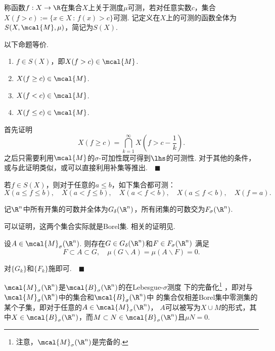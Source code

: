    \begin{defi}[可测]
     称函数$f:X\to\R$在集合$X$上关于测度$\mu$可测，若对任意实数$c$，集合$X(f>c):=\{x\in X
     \,:\,f(x)>c\}$可测. 记定义在$X$上的可测的函数全体为$S(X,\mcal{M}, \mu)$，简记为$S(X)$.
   \end{defi}

  \begin{lemma}
    以下命题等价.
    \begin{enumerate}
      \item $f\in S(X)$，即$X(f>c)\in\mcal{M}$.
      \item $X(f\ge c)\in\mcal{M}$.
      \item $X(f<c)\in\mcal{M}$.
      \item $X(f\le c)\in\mcal{M}$.
    \end{enumerate}
  \end{lemma}
  \proof
    首先证明
    \[
      X(f\ge c) = \bigcap_{k=1}^\infty X\left(f>c-\frac{1}{k}\right).
    \]
    之后只需要利用$\mcal{M}$的$\sigma$-可加性既可得到$\lhs$的可测性. 对于其他的条件，
    或与此证明类似，或可以直接利用补集等推出.$\quad\blacksquare$

  \begin{cor}
    若$f\in S(X)$，则对于任意的$a\le b$，如下集合都可测：
    \[
      X(a\le f\le b),\quad X(a<f\le b),\quad X(a<f<b),\quad X(a\le f<b), \quad 
      X(f=a).
    \]
  \end{cor}




  \begin{defi}
    记$\R^n$中所有开集的可数并全体为$G_\delta(\R^n)$，所有闭集的可数交为$F_\sigma(\R^n)$.
  \end{defi}
  \remark
    可以证明，这两个集合实际就是Borel集. 相关的证明见.

  \begin{thm}
    \label{thm: sigma-可测、开集、闭集}
    设$A\in\mcal{M}_\sigma(\R^n)$. 则存在$G\in G_\delta(\R^n)$和$F\in F_\sigma(\R^n)$
    满足
    \[
      F\subset A\subset G,\quad \mu(G\backslash A) = \mu(A\backslash F) = 0.
    \]
  \end{thm}
  \proof
    对$\{ G_k\}$和$\{ F_k\}$施即可.$\quad\blacksquare$

  \begin{cor}
    $\mcal{M}_\sigma(\R^n)$是$\mcal{B}_\sigma(\R^n)$的在Lebesgue-$\sigma$测度
    下的完备化\footnote{注意，$\mcal{M}_\sigma(\R^n)$是完备的.}
    ，即对与$\mcal{M}_\sigma(\R^n)$中的集合和$\mcal{B}_\sigma(\R^n)$中
    的集合仅相差Borel集中零测集的某个子集，即对于任意的$A\in\mcal{M}_\sigma(\R^n)$，
    $A$可以被写为$X\cup M$的形式，其中$X\in\mcal{B}_\sigma(\R^n)$，而$M\subset N
    \in\mcal{B}_\sigma(\R^n)$且$\mu N=0$.
  \end{cor}


